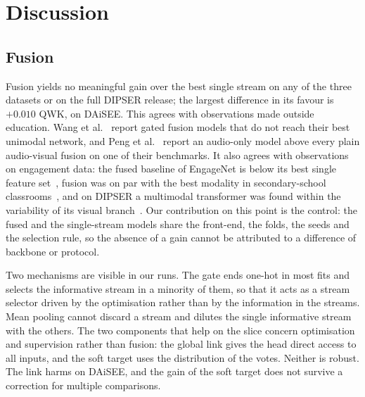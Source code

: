 \section{Discussion}
\label{sec:discussion}

\subsection{Fusion}
Fusion yields no meaningful gain over the best single stream on any of the three datasets or on the full DIPSER release; the largest difference in its favour is $+0.010$ QWK, on DAiSEE. This agrees with observations made outside education. Wang et al.~\cite{wang2020makes} report gated fusion models that do not reach their best unimodal network, and Peng et al.~\cite{peng2022balanced} report an audio-only model above every plain audio-visual fusion on one of their benchmarks. It also agrees with observations on engagement data: the fused baseline of EngageNet is below its best single feature set~\cite{singh2023engagenet}, fusion was on par with the best modality in secondary-school classrooms~\cite{sumer2023multimodal}, and on DIPSER a multimodal transformer was found within the variability of its visual branch~\cite{fragkiadakis2026fairness}. Our contribution on this point is the control: the fused and the single-stream models share the front-end, the folds, the seeds and the selection rule, so the absence of a gain cannot be attributed to a difference of backbone or protocol.

Two mechanisms are visible in our runs. The gate ends one-hot in most fits and selects the informative stream in a minority of them, so that it acts as a stream selector driven by the optimisation rather than by the information in the streams. Mean pooling cannot discard a stream and dilutes the single informative stream with the others. The two components that help on the slice concern optimisation and supervision rather than fusion: the global link gives the head direct access to all inputs, and the soft target uses the distribution of the votes. Neither is robust. The link harms on DAiSEE, and the gain of the soft target does not survive a correction for multiple comparisons.

